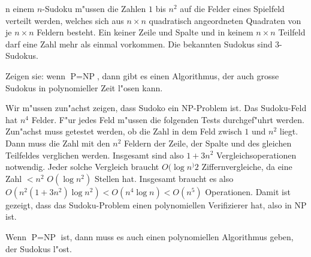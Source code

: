 n einem
$n$-Sudoku m"ussen die Zahlen $1$ bis $n^2$ auf die Felder eines
Spielfeld verteilt werden, welches sich aus $n\times n$ quadratisch
angeordneten Quadraten von je $n\times n$ Feldern besteht.
Ein keiner Zeile und Spalte und in keinem $n\times n$ Teilfeld
darf eine Zahl mehr als einmal vorkommen. Die bekannten Sudokus
sind 3-Sudokus.

Zeigen sie: wenn $\text{P}=\text{NP}$, dann gibt es einen Algorithmus,
der auch grosse Sudokus in polynomieller Zeit l"osen kann.

\begin{loesung}
Wir m"ussen zun"achst zeigen, dass Sudoko ein NP-Problem ist.
Das Sudoku-Feld hat $n^4$ Felder. F"ur jedes Feld m"ussen die
folgenden Tests durchgef"uhrt werden. Zun"achst muss getestet
werden, ob die Zahl in dem Feld zwisch $1$ und $n^2$ liegt.
Dann muss die Zahl mit den $n^2$ Feldern der Zeile, der Spalte
und des gleichen Teilfeldes verglichen werden. Insgesamt sind
also $1+3n^2$ Vergleichsoperationen notwendig. Jeder solche Vergleich
braucht $O(\log n^)2$ Ziffernvergleiche, da eine Zahl $<n^2$ $O(\log n^2)$
Stellen hat.
Insgesamt braucht es also $O(n^2(1+3n^2)\log n^2)< O(n^4\log n)<O(n^5)$
Operationen. Damit ist gezeigt, dass das Sudoku-Problem einen polynomiellen
Verifizierer hat, also in NP ist.

Wenn $\text{P}=\text{NP}$ ist, dann muss es auch einen polynomiellen
Algorithmus geben, der Sudokus l"ost.
\end{loesung}
